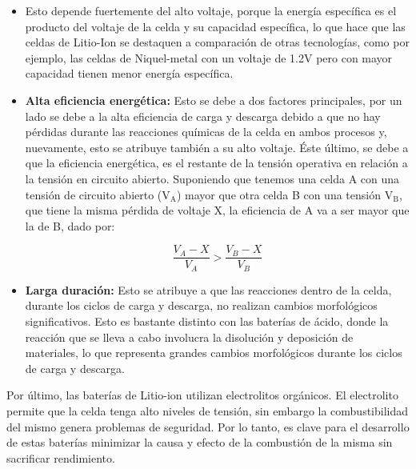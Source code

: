 \documentclass[10pt,a4paper]{article}
\begin{document}
\begin{itemize}
            pueden operar entre -25\degree C a +45\degree C. Las
            investigaciones actuales quieren extender ese rango desde
            -40\degree C a +70\degree C con mejoras en el
            electrolito y los materiales de los electrodos.
		\item \textbf{} Esto depende fuertemente del 
        alto voltaje, porque la energía específica es el producto del voltaje 
        de la celda y su capacidad específica, lo que hace que las celdas de 
        Litio-Ion se destaquen a comparación de otras tecnologías, 
        como por ejemplo, las celdas de Niquel-metal con un voltaje de 1.2V 
        pero con mayor capacidad tienen menor energía específica. 
		\item \textbf{Alta eficiencia energética:} Esto se debe a dos 
        factores principales, por un lado se debe a la alta eficiencia de 
        carga y descarga debido a que no hay pérdidas durante las reacciones 
        químicas de la celda en ambos procesos y, nuevamente, esto se atribuye 
        también a su alto voltaje. Éste último, se debe a que la eficiencia 
        energética, es el restante de la tensión operativa en relación a la 
        tensión en circuito abierto. Suponiendo que tenemos una celda A con una 
        tensión de circuito abierto ($\mathrm{V_A}$) mayor que otra celda B con 
        una tensión $\mathrm{V_B}$, que tiene la misma pérdida de voltaje X, 
        la eficiencia de A va a ser mayor que la de B, dado por:
		
		\clearpage
		\begin{equation}
			\frac{V_A - X}{V_A} > \frac{V_B - X}{V_B} \nonumber
		\end{equation}
		\item \textbf{Larga duración:} Esto se atribuye a que las reacciones 
        dentro de la celda, durante los ciclos de carga y descarga, no realizan 
        cambios morfológicos significativos. Esto es bastante distinto con las 
        baterías de ácido, donde la reacción que se lleva a cabo involucra la 
        disolución y deposición de materiales, lo que representa grandes 
        cambios morfológicos durante los ciclos de carga y descarga.
		
	\end{itemize}
	
	\noindent Por último, las baterías de Litio-ion utilizan electrolitos 
    orgánicos. El electrolito permite que la celda tenga alto niveles de 
    tensión, sin embargo la combustibilidad del mismo genera problemas de 
    seguridad. Por lo tanto, es clave para el desarrollo de estas baterías 
    minimizar la causa y efecto de la combustión de la misma sin sacrificar 
    rendimiento.
	
\end{document}
